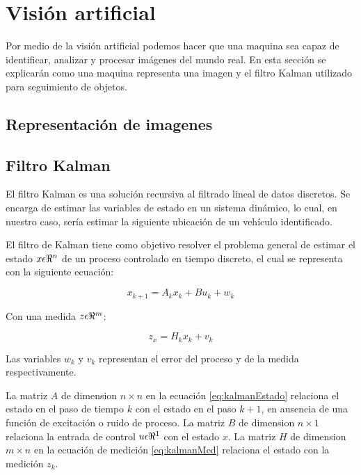 \section{Visión artificial}

Por medio de la visión artificial podemos hacer que una maquina sea capaz de identificar, analizar y procesar imágenes del mundo real. En esta sección se explicarán como una maquina representa una imagen y el filtro Kalman utilizado para seguimiento de objetos.

\subsection{Representación de imagenes}

\subsection{Filtro Kalman}

El filtro Kalman es una solución recursiva al filtrado lineal de datos discretos. Se encarga de estimar las variables de estado en un sistema dinámico, lo cual, en nuestro caso, sería estimar la siguiente ubicación de un vehículo identificado.

El filtro de Kalman tiene como objetivo resolver el problema general de estimar el estado $x \space \epsilon \space \Re^{n}$ de un proceso controlado en tiempo discreto, el cual se representa con la siguiente ecuación:

\begin{equation}
\label{eq:kalmanEstado}
    x_{k+1} = A_kx_k + Bu_k + w_k
\end{equation}

Con una medida $z \space \epsilon \space \Re^{m}$:

\begin{equation}
\label{eq:kalmanMed}
    z_x = H_kx_k + v_k
\end{equation}

Las variables $w_k$ y $v_k$ representan el error del proceso y de la medida respectivamente.

La matriz $A$  de dimension $n\times{}n$ en la ecuación \eqref{eq:kalmanEstado} relaciona el estado en el paso de tiempo $k$ con el estado en el paso $k + 1$, en ausencia de una función de excitación o ruido de proceso. La matriz $B$ de dimension $n\times{}1$ relaciona la entrada de control $u \space \epsilon \Re^{1}$ con el estado $x$. La matriz $H$ de dimension $m\times{}n$ en la ecuación de medición \eqref{eq:kalmanMed} relaciona el estado con la medición $z_k$.

